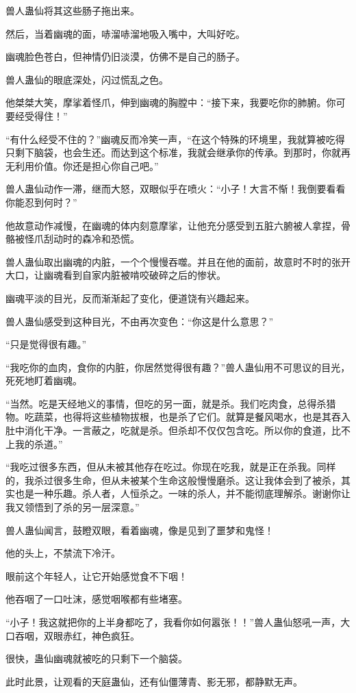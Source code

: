 \begin{this_body}
兽人蛊仙将其这些肠子拖出来。

然后，当着幽魂的面，哧溜哧溜地吸入嘴中，大叫好吃。

幽魂脸色苍白，但神情仍旧淡漠，仿佛不是自己的肠子。

兽人蛊仙的眼底深处，闪过慌乱之色。

他桀桀大笑，摩挲着怪爪，伸到幽魂的胸膛中：“接下来，我要吃你的肺腑。你可要经受得住！”

“有什么经受不住的？”幽魂反而冷笑一声，“在这个特殊的环境里，我就算被吃得只剩下脑袋，也会生还。而达到这个标准，我就会继承你的传承。到那时，你就再无利用价值。你还是担心你自己吧。”

兽人蛊仙动作一滞，继而大怒，双眼似乎在喷火：“小子！大言不惭！我倒要看看你能忍到何时？”

他故意动作减慢，在幽魂的体内刻意摩挲，让他充分感受到五脏六腑被人拿捏，骨骼被怪爪刮动时的森冷和恐慌。

兽人蛊仙取出幽魂的内脏，一个个慢慢吞噬。并且在他的面前，故意时不时的张开大口，让幽魂看到自家内脏被啃咬破碎之后的惨状。

幽魂平淡的目光，反而渐渐起了变化，便道饶有兴趣起来。

兽人蛊仙感受到这种目光，不由再次变色：“你这是什么意思？”

“只是觉得很有趣。”

“我吃你的血肉，食你的内脏，你居然觉得很有趣？”兽人蛊仙用不可思议的目光，死死地盯着幽魂。

“当然。吃是天经地义的事情，但吃的另一面，就是杀。我们吃肉食，总得杀猎物。吃蔬菜，也得将这些植物拔根，也是杀了它们。就算是餐风喝水，也是其吞入肚中消化干净。一言蔽之，吃就是杀。但杀却不仅仅包含吃。所以你的食道，比不上我的杀道。”

“我吃过很多东西，但从未被其他存在吃过。你现在吃我，就是正在杀我。同样的，我杀过很多生命，但从未被某个生命这般慢慢磨杀。这让我体会到了被杀，其实也是一种乐趣。杀人者，人恒杀之。一味的杀人，并不能彻底理解杀。谢谢你让我又领悟到了杀的另一层深意。”

兽人蛊仙闻言，鼓瞪双眼，看着幽魂，像是见到了噩梦和鬼怪！

他的头上，不禁流下冷汗。

眼前这个年轻人，让它开始感觉食不下咽！

他吞咽了一口吐沫，感觉咽喉都有些堵塞。

“小子！我这就把你的上半身都吃了，我看你如何嚣张！！”兽人蛊仙怒吼一声，大口吞咽，双眼赤红，神色疯狂。

很快，蛊仙幽魂就被吃的只剩下一个脑袋。

此时此景，让观看的天庭蛊仙，还有仙僵薄青、影无邪，都静默无声。


\end{this_body}
